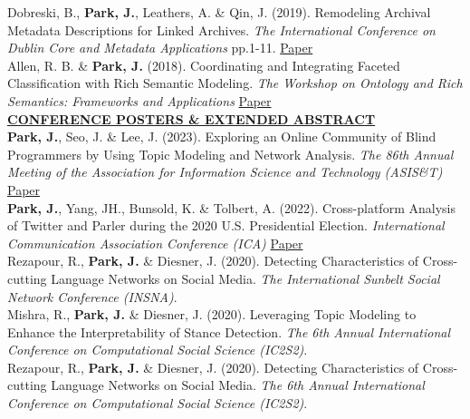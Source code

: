 \documentclass{article}
\begin{document}
\noindent Dobreski, B., \textbf{Park, J.}, Leathers, A. \& Qin, J. (2019). Remodeling Archival Metadata Descriptions for Linked Archives. \textit{The International Conference on Dublin Core and Metadata Applications} pp.1-11. \hfill \href{https://dcpapers.dublincore.org/article/952141553}{Paper} \\ 

\noindent Allen, R. B. \& \textbf{Park, J.} (2018). Coordinating and Integrating Faceted Classification with Rich Semantic Modeling. \textit{The Workshop on Ontology and Rich Semantics: Frameworks and Applications} \hfill \href{https://arxiv.org/abs/1809.09548}{Paper} \\

\noindent \textbf{\underline{CONFERENCE POSTERS \& EXTENDED ABSTRACT}} \\
\noindent \textbf{Park, J.}, Seo, J. \& Lee, J. (2023). Exploring an Online Community of Blind Programmers by Using Topic Modeling and Network Analysis. \textit{The 86th Annual Meeting of the Association for Information Science and Technology (ASIS\&T)} \hfill \href{https://doi.org/10.1002/pra2.956}{Paper} \\

\noindent \textbf{Park, J.}, Yang, JH., Bunsold, K. \& Tolbert, A. (2022). Cross-platform Analysis of Twitter and Parler during the 2020 U.S. Presidential Election. \textit{International Communication Association Conference (ICA)} \hfill \href{https://www.ideals.illinois.edu/items/121292}{Paper} \\ 

\noindent Rezapour, R., \textbf{Park, J.} \& Diesner, J. (2020). Detecting Characteristics of Cross-cutting Language Networks on Social Media. \textit{The International Sunbelt Social Network Conference (INSNA)}. \\

\noindent Mishra, R., \textbf{Park, J.} \& Diesner, J. (2020). Leveraging Topic Modeling to Enhance the Interpretability of Stance Detection. \textit{The 6th Annual International Conference on Computational Social Science (IC2S2)}. \\

\noindent Rezapour, R., \textbf{Park, J.} \& Diesner, J. (2020). Detecting Characteristics of Cross-cutting Language Networks on Social Media. \textit{The 6th Annual International Conference on Computational Social Science (IC2S2)}. \\

\end{document}
